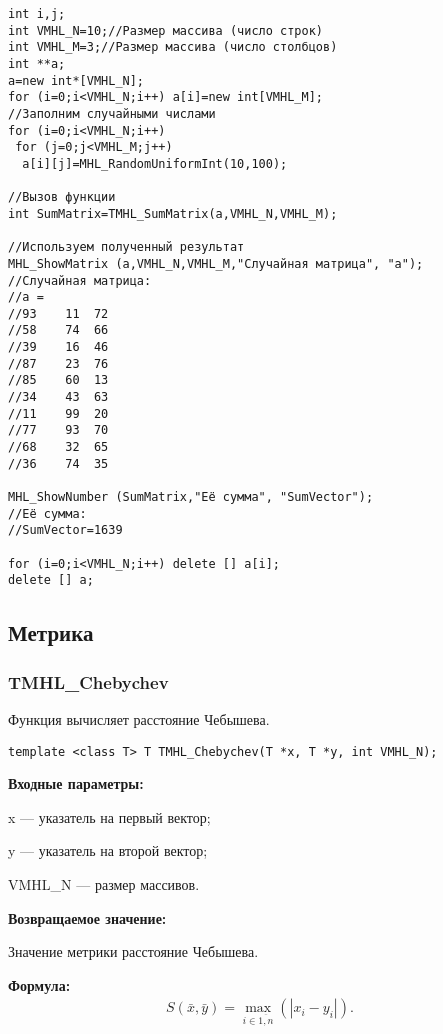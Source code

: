 \documentclass[a4paper,12pt]{article}
\begin{document}
\begin{lstlisting}[label=code_use_TMHL_ZeroMatrix,caption=Пример использования]
int i,j;
int VMHL_N=10;//Размер массива (число строк)
int VMHL_M=3;//Размер массива (число столбцов)
int **a;
a=new int*[VMHL_N];
for (i=0;i<VMHL_N;i++) a[i]=new int[VMHL_M];
//Заполним случайными числами
for (i=0;i<VMHL_N;i++)
 for (j=0;j<VMHL_M;j++)
  a[i][j]=MHL_RandomUniformInt(10,100);

//Вызов функции
int SumMatrix=TMHL_SumMatrix(a,VMHL_N,VMHL_M);

//Используем полученный результат
MHL_ShowMatrix (a,VMHL_N,VMHL_M,"Случайная матрица", "a");
//Случайная матрица:
//a =
//93	11	72
//58	74	66
//39	16	46
//87	23	76
//85	60	13
//34	43	63
//11	99	20
//77	93	70
//68	32	65
//36	74	35

MHL_ShowNumber (SumMatrix,"Её сумма", "SumVector");
//Её сумма:
//SumVector=1639

for (i=0;i<VMHL_N;i++) delete [] a[i];
delete [] a;
\end{lstlisting}

\subsection{Метрика}

\subsubsection{TMHL\_Chebychev}\label{TMHL_Chebychev}

Функция вычисляет расстояние Чебышева.


\begin{lstlisting}[label=code_syntax_TMHL_Chebychev,caption=Синтаксис]
template <class T> T TMHL_Chebychev(T *x, T *y, int VMHL_N);
\end{lstlisting}

\textbf{Входные параметры:}
 
x --- указатель на первый вектор;
 
y --- указатель на второй вектор;
 
VMHL\_N --- размер массивов.

\textbf{Возвращаемое значение:}
 
Значение метрики расстояние Чебышева.

\textbf{Формула:}
\begin{eqnarray*}
S\left( \bar{x}, \bar{y}\right)=\max_{i\in\overline{1,n}}\left( \left|x_i-y_i \right| \right)  .
\end{eqnarray*}
\end{document}
